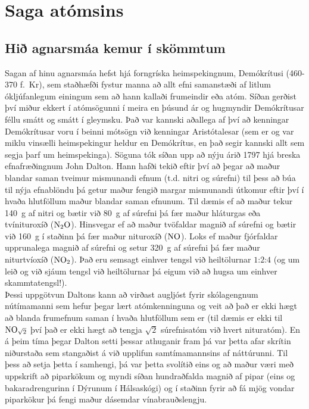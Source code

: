 \chapter{Saga atómsins}

\section{Hið agnarsmáa kemur í skömmtum}

Sagan af hinu agnarsmáa hefst hjá forngríska heimspekingnum, Demókrítusi (460-370 f.~Kr), sem staðhæfði fystur manna að allt efni samanstæði af litlum ókljúfanlegum einingum sem að hann kallaði frumeindir eða atóm. Síðan gerðist því miður ekkert í atómsögunni í meira en þúsund ár og hugmyndir Demókrítusar féllu smátt og smátt í gleymsku. Það var kannski aðallega af því að kenningar Demókrítusar voru í beinni mótsögn við kenningar Aristótalesar (sem er og var miklu vinsælli heimspekingur heldur en Demókrítus, en það segir kannski allt sem segja þarf um heimspekinga). Söguna tók síðan upp að nýju árið 1797 hjá breska efnafræðingnum John Dalton. Hann hafði tekið eftir því að þegar að maður blandar saman tveimur mismunandi efnum (t.d. nitri og súrefni) til þess að búa til nýja efnablöndu þá getur maður fengið margar mismunandi útkomur eftir því í hvaða hlutföllum maður blandar saman efnunum. Til dæmis ef að maður tekur \SI{140}{g} af nitri og bætir við \SI{80}{g} af súrefni þá fær maður hláturgas eða tvínituroxíð ($\ce{N_2O}$). Hinsvegar ef að maður tvöfaldar magnið af súrefni og bætir við \SI{160}{g} í staðinn þá fær maður nituroxíð ($\ce{NO}$). Loks ef maður fjórfaldar upprunalega magnið af súrefni og setur \SI{320}{g} af súrefni þá fær maður niturtvíoxíð ($\ce{NO_2}$). Það eru semsagt einhver tengsl við heiltölurnar $1$:$2$:$4$ (og um leið og við sjáum tengsl við heiltölurnar þá eigum við að hugsa um einhver skammtatengsl!). \\

Þessi uppgötvun Daltons kann að virðast augljóst fyrir skólagengnum nútímamanni sem hefur þegar lært atómkenninguna og veit að það er ekki hægt að blanda frumefnum saman í hvaða hlutföllum sem er (til dæmis er ekki til $\ce{NO_{\sqrt{2}}}$ því það er ekki hægt að tengja $\sqrt{2}$ súrefnisatóm við hvert nituratóm). En á þeim tíma þegar Dalton setti þessar athuganir fram þá var þetta afar skrítin niðurstaða sem stangaðist á við upplifun samtímamannsins af náttúrunni. Til þess að setja þetta í samhengi, þá var þetta svolítið eins og að maður væri með uppskrift að piparkökum og myndi síðan hundraðfalda magnið af pipar (eins og bakaradrengurinn í Dýrunum í Hálsaskógi) og í staðinn fyrir að fá mjög vondar piparkökur þá fengi maður dásemdar vínabrauðslengju. \\

